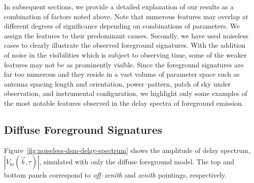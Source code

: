 \documentclass[preprint2,iop,numberedappendix]{emulateapj}
\begin{document}
\begin{itemize}

\end{itemize}

In subsequent sections, we provide a detailed explanation of our results as a combination of factors noted above. Note that numerous features may overlap at different degrees of significance depending on combinations of parameters. We assign the features to their predominant causes. Secondly, we have used noiseless cases to clearly illustrate the observed foreground signatures. With the addition of noise in the visibilities which is subject to observing time, some of the weaker features may not be as prominently visible. Since the foreground signatures are far too numerous and they reside in a vast volume of parameter space such as antenna spacing length and orientation, power--pattern, patch of sky under observation, and instrumental configuration, we highlight only some examples of the most notable features observed in the delay spectra of foreground emission.

\subsection{Diffuse Foreground Signatures}\label{sec:diffuse}

Figure~\ref{fig:noiseless-dsm-delay-spectrum} shows the amplitude of delay spectrum, $|V_{b\tau}(\vec{b},\tau)|$, simulated with only the diffuse foreground model. The top and bottom panels correspond to {\it off--zenith} and {\it zenith} pointings, respectively. 
\end{document}

